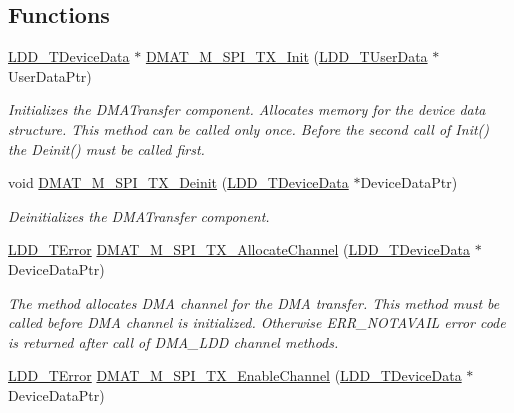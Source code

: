\subsection*{Functions}
\begin{DoxyCompactItemize}
\item 
\hyperlink{group___p_e___types__module_gac5cf1362f1f0e3a2ce71b1bf2276d091}{L\-D\-D\-\_\-\-T\-Device\-Data} $\ast$ \hyperlink{group___d_m_a_t___m___s_p_i___t_x__module_ga95c3704b8d48c499e7a75f797cf5a3e4}{D\-M\-A\-T\-\_\-\-M\-\_\-\-S\-P\-I\-\_\-\-T\-X\-\_\-\-Init} (\hyperlink{group___p_e___types__module_ga0b66a73f87238a782318aa0be7578e35}{L\-D\-D\-\_\-\-T\-User\-Data} $\ast$User\-Data\-Ptr)
\begin{DoxyCompactList}\small\item\em Initializes the D\-M\-A\-Transfer component. Allocates memory for the device data structure. This method can be called only once. Before the second call of Init() the Deinit() must be called first. \end{DoxyCompactList}\item 
void \hyperlink{group___d_m_a_t___m___s_p_i___t_x__module_gad3cfb364d0cdb71744ac5c912136e274}{D\-M\-A\-T\-\_\-\-M\-\_\-\-S\-P\-I\-\_\-\-T\-X\-\_\-\-Deinit} (\hyperlink{group___p_e___types__module_gac5cf1362f1f0e3a2ce71b1bf2276d091}{L\-D\-D\-\_\-\-T\-Device\-Data} $\ast$Device\-Data\-Ptr)
\begin{DoxyCompactList}\small\item\em Deinitializes the D\-M\-A\-Transfer component. \end{DoxyCompactList}\item 
\hyperlink{group___p_e___types__module_ga24c2b045fd04e79e85f261ce4df35588}{L\-D\-D\-\_\-\-T\-Error} \hyperlink{group___d_m_a_t___m___s_p_i___t_x__module_ga776adbfbb06d8b0cf147b086f875616f}{D\-M\-A\-T\-\_\-\-M\-\_\-\-S\-P\-I\-\_\-\-T\-X\-\_\-\-Allocate\-Channel} (\hyperlink{group___p_e___types__module_gac5cf1362f1f0e3a2ce71b1bf2276d091}{L\-D\-D\-\_\-\-T\-Device\-Data} $\ast$Device\-Data\-Ptr)
\begin{DoxyCompactList}\small\item\em The method allocates D\-M\-A channel for the D\-M\-A transfer. This method must be called before D\-M\-A channel is initialized. Otherwise E\-R\-R\-\_\-\-N\-O\-T\-A\-V\-A\-I\-L error code is returned after call of D\-M\-A\-\_\-\-L\-D\-D channel methods. \end{DoxyCompactList}\item 
\hyperlink{group___p_e___types__module_ga24c2b045fd04e79e85f261ce4df35588}{L\-D\-D\-\_\-\-T\-Error} \hyperlink{group___d_m_a_t___m___s_p_i___t_x__module_ga7c78e2312b7dea13bafe530139deec3c}{D\-M\-A\-T\-\_\-\-M\-\_\-\-S\-P\-I\-\_\-\-T\-X\-\_\-\-Enable\-Channel} (\hyperlink{group___p_e___types__module_gac5cf1362f1f0e3a2ce71b1bf2276d091}{L\-D\-D\-\_\-\-T\-Device\-Data} $\ast$Device\-Data\-Ptr)

\end{DoxyCompactItemize}
